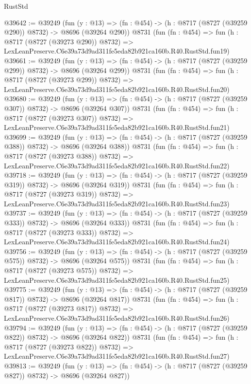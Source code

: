 \begin{lexlean}{RustStd}
\begin{coremodule}
@39642 := @39249
    (fun (y : @13) => (fn : @454) -> (h : @8717 (@8727 (@39259 @290)) @8732) -> @8696 (@39264 @290))
    @8731
    (fun (fn : @454) =>
    fun (h : @8717 (@8727 (@39273 @290)) @8732) =>
    LexLeanPreserve.C6e39a73d9ad311fe5eda82b921ca160b.R40.RustStd.fun19)
@39661 := @39249
    (fun (y : @13) => (fn : @454) -> (h : @8717 (@8727 (@39259 @299)) @8732) -> @8696 (@39264 @299))
    @8731
    (fun (fn : @454) =>
    fun (h : @8717 (@8727 (@39273 @299)) @8732) =>
    LexLeanPreserve.C6e39a73d9ad311fe5eda82b921ca160b.R40.RustStd.fun20)
@39680 := @39249
    (fun (y : @13) => (fn : @454) -> (h : @8717 (@8727 (@39259 @307)) @8732) -> @8696 (@39264 @307))
    @8731
    (fun (fn : @454) =>
    fun (h : @8717 (@8727 (@39273 @307)) @8732) =>
    LexLeanPreserve.C6e39a73d9ad311fe5eda82b921ca160b.R40.RustStd.fun21)
@39699 := @39249
    (fun (y : @13) => (fn : @454) -> (h : @8717 (@8727 (@39259 @388)) @8732) -> @8696 (@39264 @388))
    @8731
    (fun (fn : @454) =>
    fun (h : @8717 (@8727 (@39273 @388)) @8732) =>
    LexLeanPreserve.C6e39a73d9ad311fe5eda82b921ca160b.R40.RustStd.fun22)
@39718 := @39249
    (fun (y : @13) => (fn : @454) -> (h : @8717 (@8727 (@39259 @319)) @8732) -> @8696 (@39264 @319))
    @8731
    (fun (fn : @454) =>
    fun (h : @8717 (@8727 (@39273 @319)) @8732) =>
    LexLeanPreserve.C6e39a73d9ad311fe5eda82b921ca160b.R40.RustStd.fun23)
@39737 := @39249
    (fun (y : @13) => (fn : @454) -> (h : @8717 (@8727 (@39259 @333)) @8732) -> @8696 (@39264 @333))
    @8731
    (fun (fn : @454) =>
    fun (h : @8717 (@8727 (@39273 @333)) @8732) =>
    LexLeanPreserve.C6e39a73d9ad311fe5eda82b921ca160b.R40.RustStd.fun24)
@39756 := @39249
    (fun (y : @13) => (fn : @454) -> (h : @8717 (@8727 (@39259 @575)) @8732) -> @8696 (@39264 @575))
    @8731
    (fun (fn : @454) =>
    fun (h : @8717 (@8727 (@39273 @575)) @8732) =>
    LexLeanPreserve.C6e39a73d9ad311fe5eda82b921ca160b.R40.RustStd.fun25)
@39775 := @39249
    (fun (y : @13) => (fn : @454) -> (h : @8717 (@8727 (@39259 @817)) @8732) -> @8696 (@39264 @817))
    @8731
    (fun (fn : @454) =>
    fun (h : @8717 (@8727 (@39273 @817)) @8732) =>
    LexLeanPreserve.C6e39a73d9ad311fe5eda82b921ca160b.R40.RustStd.fun26)
@39794 := @39249
    (fun (y : @13) => (fn : @454) -> (h : @8717 (@8727 (@39259 @822)) @8732) -> @8696 (@39264 @822))
    @8731
    (fun (fn : @454) =>
    fun (h : @8717 (@8727 (@39273 @822)) @8732) =>
    LexLeanPreserve.C6e39a73d9ad311fe5eda82b921ca160b.R40.RustStd.fun27)
@39813 := @39249
    (fun (y : @13) => (fn : @454) -> (h : @8717 (@8727 (@39259 @827)) @8732) -> @8696 (@39264 @827))

\end{coremodule}
\end{lexlean}
